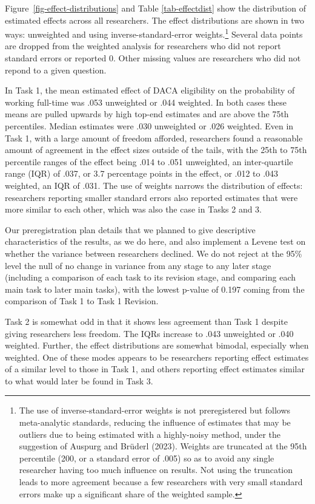\documentclass[
  letterpaper,
  DIV=11,
  numbers=noendperiod]{scrartcl}
\begin{document}
Figure~\ref{fig-effect-distributions} and Table \ref{tab-effectdist}
show the distribution of estimated effects across all researchers. The
effect distributions are shown in two ways: unweighted and using
inverse-standard-error weights.\footnote{The use of
  inverse-standard-error weights is not preregistered but follows
  meta-analytic standards, reducing the influence of estimates that may
  be outliers due to being estimated with a highly-noisy method, under
  the suggestion of Auspurg and Brüderl (2023). Weights are truncated at
  the 95th percentile (200, or a standard error of .005) so as to avoid
  any single researcher having too much influence on results. Not using
  the truncation leads to more agreement because a few researchers with
  very small standard errors make up a significant share of the weighted
  sample.} Several data points are dropped from the weighted analysis
for researchers who did not report standard errors or reported 0. Other
missing values are researchers who did not repond to a given question.

In Task 1, the mean estimated effect of DACA eligibility on the
probability of working full-time was .053 unweighted or .044 weighted.
In both cases these means are pulled upwards by high top-end estimates
and are above the 75th percentiles. Median estimates were .030
unweighted or .026 weighted. Even in Task 1, with a large amount of
freedom afforded, researchers found a reasonable amount of agreement in
the effect sizes outside of the tails, with the 25th to 75th percentile
ranges of the effect being .014 to .051 unweighted, an inter-quartile
range (IQR) of .037, or 3.7 percentage points in the effect, or .012 to
.043 weighted, an IQR of .031. The use of weights narrows the
distribution of effects: researchers reporting smaller standard errors
also reported estimates that were more similar to each other, which was
also the case in Tasks 2 and 3.

Our preregistration plan details that we planned to give descriptive
characteristics of the results, as we do here, and also implement a
Levene test on whether the variance between researchers declined. We do
not reject at the 95\% level the null of no change in variance from any
stage to any later stage (including a comparison of each task to its
revision stage, and comparing each main task to later main tasks), with
the lowest p-value of 0.197 coming from the comparison of Task 1 to Task
1 Revision.

Task 2 is somewhat odd in that it shows less agreement than Task 1
despite giving researchers less freedom. The IQRs increase to .043
unweighted or .040 weighted. Further, the effect distributions are
somewhat bimodal, especially when weighted. One of these modes appears
to be researchers reporting effect estimates of a similar level to those
in Task 1, and others reporting effect estimates similar to what would
later be found in Task 3.
\end{document}
